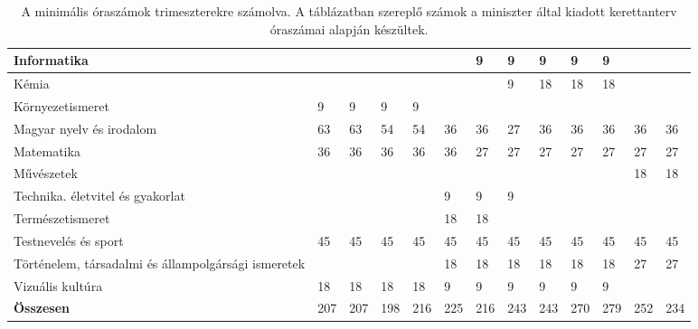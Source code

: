 \begin{landscape}
\begin{table}[]
\begin{tabular}{l|l|l|l|l|l|l|l|l|l|l|l|l}
    Informatika                                         &     &     &     &     &     & 9   & 9   & 9   & 9   & 9   &     &     \\\hline
    Kémia                                               &     &     &     &     &     &     & 9   & 18  & 18  & 18  &     &     \\\hline
    Környezetismeret                                    & 9   & 9   & 9   & 9   &     &     &     &     &     &     &     &     \\\hline
    Magyar nyelv és irodalom                            & 63  & 63  & 54  & 54  & 36  & 36  & 27  & 36  & 36  & 36  & 36  & 36  \\\hline
    Matematika                                          & 36  & 36  & 36  & 36  & 36  & 27  & 27  & 27  & 27  & 27  & 27  & 27  \\\hline
    Művészetek                                          &     &     &     &     &     &     &     &     &     &     & 18  & 18  \\\hline
    Technika. életvitel és gyakorlat                    &     &     &     &     & 9   & 9   & 9   &     &     &     &     &     \\\hline
    Természetismeret                                    &     &     &     &     & 18  & 18  &     &     &     &     &     &     \\\hline
    Testnevelés és sport                                & 45  & 45  & 45  & 45  & 45  & 45  & 45  & 45  & 45  & 45  & 45  & 45  \\\hline
    Történelem, társadalmi és állampolgársági ismeretek &     &     &     &     & 18  & 18  & 18  & 18  & 18  & 18  & 27  & 27  \\\hline
    Vizuális kultúra                                    & 18  & 18  & 18  & 18  & 9   & 9   & 9   & 9   & 9   & 9   &     &     \\\hline \hline
    \textbf{Összesen}                                   & 207 & 207 & 198 & 216 & 225 & 216 & 243 & 243 & 270 & 279 & 252 & 234
    

  \end{tabular}
  \caption{A minimális óraszámok trimeszterekre számolva. A táblázatban szereplő számok a miniszter által kiadott kerettanterv óraszámai alapján készültek.}  
  \label{tbl:oraszamok}
\end{table}

\end{landscape}